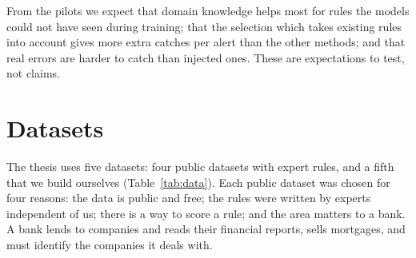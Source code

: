 \documentclass[11pt,a4paper]{article}
\begin{document}
From the pilots we expect that domain knowledge helps most for rules the models could not have seen during training; that the selection which takes existing rules into account gives more extra catches per alert than the other methods; and that real errors are harder to catch than injected ones. These are expectations to test, not claims.

\section{Datasets}

The thesis uses five datasets: four public datasets with expert rules, and a fifth that we build ourselves (Table~\ref{tab:data}). Each public dataset was chosen for four reasons: the data is public and free; the rules were written by experts independent of us; there is a way to score a rule; and the area matters to a bank. A bank lends to companies and reads their financial reports, sells mortgages, and must identify the companies it deals with.
\end{document}
